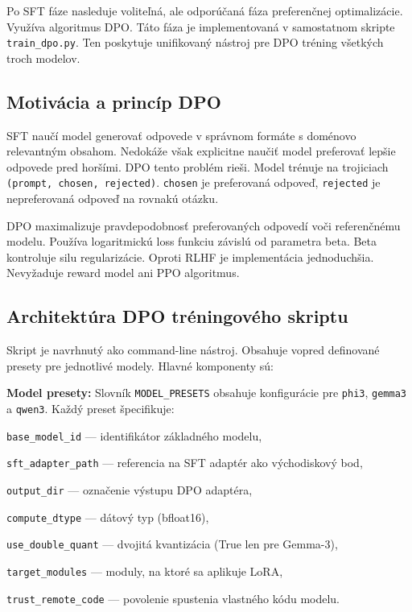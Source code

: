 Po SFT fáze nasleduje voliteľná, ale odporúčaná fáza preferenčnej optimalizácie. Využíva algoritmus DPO. Táto fáza je implementovaná v samostatnom skripte \texttt{train\_dpo.py}. Ten poskytuje unifikovaný nástroj pre DPO tréning všetkých troch modelov.
 
\subsection{Motivácia a princíp DPO}
 
SFT naučí model generovať odpovede v správnom formáte s doménovo relevantným obsahom. Nedokáže však explicitne naučiť model preferovať lepšie odpovede pred horšími. DPO tento problém rieši. Model trénuje na trojiciach \texttt{(prompt, chosen, rejected)}. \texttt{chosen} je preferovaná odpoveď, \texttt{rejected} je nepreferovaná odpoveď na rovnakú otázku.
 
DPO maximalizuje pravdepodobnosť preferovaných odpovedí voči referenčnému modelu. Používa logaritmickú loss funkciu závislú od parametra beta. Beta kontroluje silu regularizácie. Oproti RLHF je implementácia jednoduchšia. Nevyžaduje reward model ani PPO algoritmus.
 
\subsection{Architektúra DPO tréningového skriptu}
 
Skript je navrhnutý ako command-line nástroj. Obsahuje vopred definované presety pre jednotlivé modely. Hlavné komponenty sú:
 
\textbf{Model presety:} Slovník \texttt{MODEL\_PRESETS} obsahuje konfigurácie pre \texttt{phi3}, \texttt{gemma3} a \texttt{qwen3}. Každý preset špecifikuje:\par\medskip
\noindent\texttt{base\_model\_id} — identifikátor základného modelu,\par\medskip
\noindent\texttt{sft\_adapter\_path} — referencia na SFT adaptér ako východiskový bod,\par\medskip
\noindent\texttt{output\_dir} — označenie výstupu DPO adaptéra,\par\medskip
\noindent\texttt{compute\_dtype} — dátový typ (bfloat16),\par\medskip
\noindent\texttt{use\_double\_quant} — dvojitá kvantizácia (True len pre Gemma-3),\par\medskip
\noindent\texttt{target\_modules} — moduly, na ktoré sa aplikuje LoRA,\par\medskip
\noindent\texttt{trust\_remote\_code} — povolenie spustenia vlastného kódu modelu.\par\medskip
 
